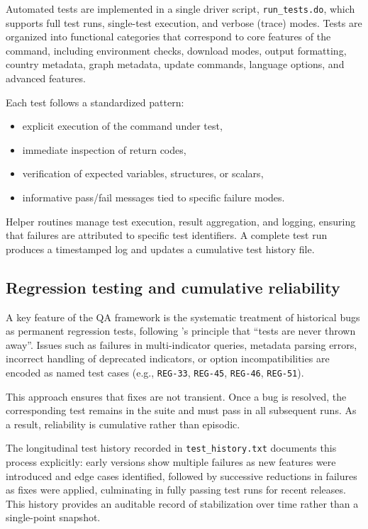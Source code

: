 \documentclass[bib]{statapress}
\begin{document}
Automated tests are implemented in a single driver script,
\texttt{run\_tests.do}, which supports full test runs, single-test execution,
and verbose (trace) modes. Tests are organized into functional categories that
correspond to core features of the command, including environment checks,
download modes, output formatting, country metadata, graph metadata, update
commands, language options, and advanced features.

Each test follows a standardized pattern:
\begin{itemize}
  \item explicit execution of the command under test,
  \item immediate inspection of return codes,
  \item verification of expected variables, structures, or scalars,
  \item informative pass/fail messages tied to specific failure modes.
\end{itemize}

Helper routines manage test execution, result aggregation, and logging, ensuring
that failures are attributed to specific test identifiers. A complete test run
produces a timestamped log and updates a cumulative test history file.

\subsection{Regression testing and cumulative reliability}

A key feature of the QA framework is the systematic treatment of historical
bugs as permanent regression tests, following \citeauthor{gould2001certification}'s
principle that ``tests are never thrown away''.
Issues such as failures in multi-indicator queries, metadata parsing errors,
incorrect handling of deprecated indicators, or option incompatibilities are
encoded as named test cases (e.g., \texttt{REG-33}, \texttt{REG-45},
\texttt{REG-46}, \texttt{REG-51}).

This approach ensures that fixes are not transient. Once a bug is resolved, the
corresponding test remains in the suite and must pass in all subsequent runs.
As a result, reliability is cumulative rather than episodic.

The longitudinal test history recorded in \texttt{test\_history.txt} documents
this process explicitly: early versions show multiple failures as new features
were introduced and edge cases identified, followed by successive reductions in
failures as fixes were applied, culminating in fully passing test runs for
recent releases. This history provides an auditable record of stabilization over
time rather than a single-point snapshot.
\end{document}
